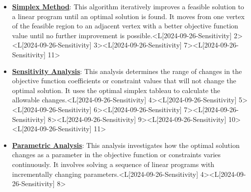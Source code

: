 \documentclass{article}%
\begin{document}
\begin{itemize}[[leftmargin=*]]%
\item \href{https://www.math.purdue.edu/~yipn/421/2024-09-26-Sensitivity.pdf#page=2}{\textbf{Simplex Method}}: This algorithm iteratively improves a feasible solution to a linear program until an optimal solution is found. It moves from one vertex of the feasible region to an adjacent vertex with a better objective function value until no further improvement is possible.<L[2024-09-26-Sensitivity] 2><L[2024-09-26-Sensitivity] 3><L[2024-09-26-Sensitivity] 7><L[2024-09-26-Sensitivity] 11>%
\item \href{https://www.math.purdue.edu/~yipn/421/2024-09-26-Sensitivity.pdf#page=4}{\textbf{Sensitivity Analysis}}: This analysis determines the range of changes in the objective function coefficients or constraint values that will not change the optimal solution. It uses the optimal simplex tableau to calculate the allowable changes.<L[2024-09-26-Sensitivity] 4><L[2024-09-26-Sensitivity] 5><L[2024-09-26-Sensitivity] 6><L[2024-09-26-Sensitivity] 7><L[2024-09-26-Sensitivity] 8><L[2024-09-26-Sensitivity] 9><L[2024-09-26-Sensitivity] 10><L[2024-09-26-Sensitivity] 11>%
\item \href{https://www.math.purdue.edu/~yipn/421/2024-09-26-Sensitivity.pdf#page=4}{\textbf{Parametric Analysis}}: This analysis investigates how the optimal solution changes as a parameter in the objective function or constraints varies continuously. It involves solving a sequence of linear programs with incrementally changing parameters.<L[2024-09-26-Sensitivity] 4><L[2024-09-26-Sensitivity] 8>%
\end{itemize}%
\end{document}
